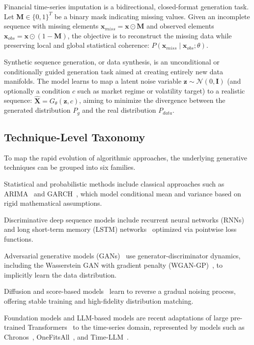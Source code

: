 Financial time-series imputation is a bidirectional, closed-format generation task. Let $\mathbf{M} \in \{0, 1\}^T$ be a binary mask indicating missing values. Given an incomplete sequence with missing elements $\mathbf{x}_{miss} = \mathbf{x} \odot \mathbf{M}$ and observed elements $\mathbf{x}_{obs} = \mathbf{x} \odot (1-\mathbf{M})$, the objective is to reconstruct the missing data while preserving local and global statistical coherence: $P(\mathbf{x}_{miss} \mid \mathbf{x}_{obs}; \theta)$.

Synthetic sequence generation, or data synthesis, is an unconditional or conditionally guided generation task aimed at creating entirely new data manifolds. The model learns to map a latent noise variable $\mathbf{z} \sim \mathcal{N}(0, \mathbf{I})$ (and optionally a condition $c$ such as market regime or volatility target) to a realistic sequence: $\hat{\mathbf{X}} = G_{\theta}(\mathbf{z}, c)$, aiming to minimize the divergence between the generated distribution $P_g$ and the real distribution $P_{data}$.

\subsection{Technique-Level Taxonomy}
To map the rapid evolution of algorithmic approaches, the underlying generative techniques can be grouped into six families.

Statistical and probabilistic methods include classical approaches such as ARIMA~\citep{box2015time} and GARCH~\citep{bollerslev1986garch}, which model conditional mean and variance based on rigid mathematical assumptions.

Discriminative deep sequence models include recurrent neural networks (RNNs)~\citep{elman1990finding} and long short-term memory (LSTM) networks~\citep{hochreiter1997lstm} optimized via pointwise loss functions.

Adversarial generative models (GANs)~\citep{goodfellow2014gan} use generator-discriminator dynamics, including the Wasserstein GAN with gradient penalty (WGAN-GP)~\citep{arjovsky2017wgan,gulrajani2017wgangp}, to implicitly learn the data distribution.

Diffusion and score-based models~\citep{ho2020ddpm,song2019generative,song2021score} learn to reverse a gradual noising process, offering stable training and high-fidelity distribution matching.

Foundation models and LLM-based models are recent adaptations of large pre-trained Transformers~\citep{vaswani2017attention,brown2020language} to the time-series domain, represented by models such as Chronos~\citep{ansari2024chronos}, OneFitsAll~\citep{zhou2023onefitsall}, and Time-LLM~\citep{jin2024timellm}.

